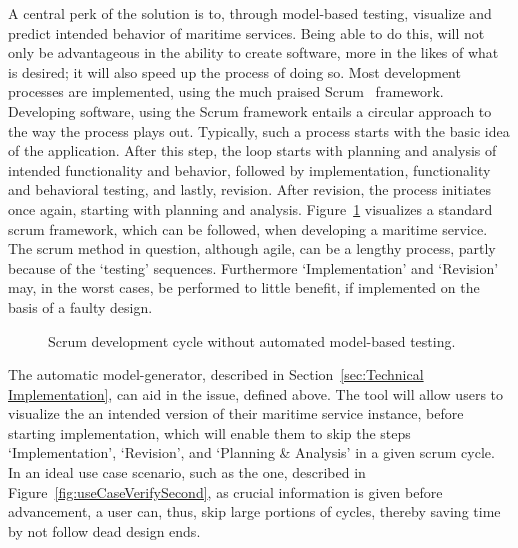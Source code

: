 A central perk of the solution is to, through model-based testing, visualize and predict intended behavior of maritime services. Being able to do this, will not only be advantageous in the ability to create software, more in the likes of what is desired; it will also speed up the process of doing so. Most development processes are implemented, using the much praised Scrum~\cite{scrum} framework. Developing software, using the Scrum framework entails a circular approach to the way the process plays out. Typically, such a process starts with the basic idea of the application. After this step, the loop starts with planning and analysis of intended functionality and behavior, followed by implementation, functionality and behavioral testing, and lastly, revision. After revision, the process initiates once again, starting with planning and analysis.
\newpage
\noindent
Figure~\ref{fig:scrumBig} visualizes a standard scrum framework, which can be followed, when developing a maritime service. The scrum method in question, although agile, can be a lengthy process, partly because of the `testing' sequences. Furthermore `Implementation' and `Revision' may, in the worst cases, be performed to little benefit, if implemented on the basis of a faulty design.
\begin{figure}[h]
  \centering
  \caption{Scrum development cycle without automated model-based testing.}
  \label{fig:scrumBig}
\end{figure}

The automatic model-generator, described in Section~\ref{sec:Technical Implementation}, can aid in the issue, defined above. The tool will allow users to visualize the an intended version of their maritime service instance, before starting implementation, which will enable them to skip the steps `Implementation', `Revision', and `Planning \& Analysis' in a given scrum cycle. In an ideal use case scenario, such as the one, described in Figure~\ref{fig:useCaseVerifySecond}, as crucial information is given before advancement, a user can, thus, skip large portions of cycles, thereby saving time by not follow dead design ends.

